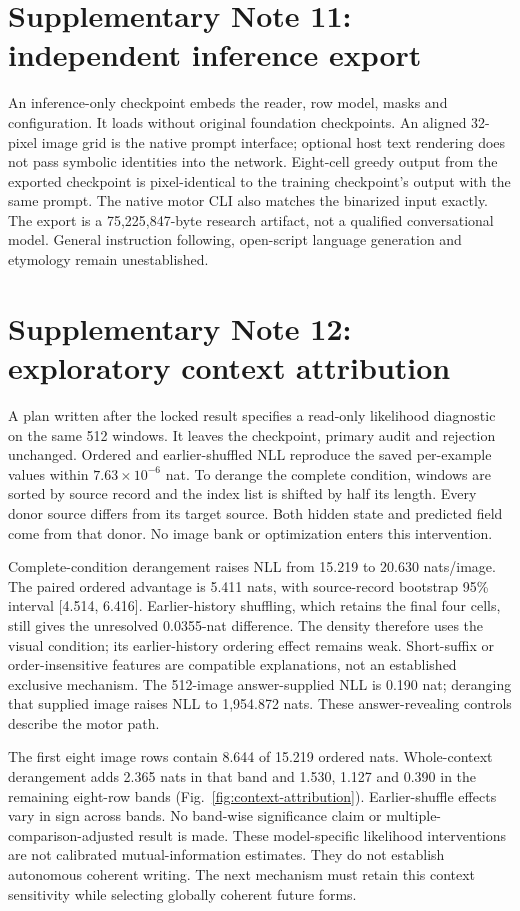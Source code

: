 \documentclass[10pt,a4paper]{article}
\begin{document}
\section*{Supplementary Note 11: independent inference export}
An inference-only checkpoint embeds the reader, row model, masks and
configuration. It loads without original foundation checkpoints. An aligned
32-pixel image grid is the native prompt interface; optional host text rendering
does not pass symbolic identities into the network. Eight-cell greedy output
from the exported checkpoint is pixel-identical to the training checkpoint's
output with the same prompt. The native motor CLI also matches the binarized
input exactly. The export is a 75,225,847-byte research artifact, not a
qualified conversational model. General instruction following, open-script
language generation and etymology remain unestablished.

\section*{Supplementary Note 12: exploratory context attribution}
A plan written after the locked result specifies a read-only likelihood
diagnostic on the same 512 windows. It leaves the checkpoint, primary audit
and rejection unchanged. Ordered and earlier-shuffled NLL reproduce the saved
per-example values within $7.63\times10^{-6}$ nat. To derange the complete
condition, windows are sorted by source record and the index list is shifted
by half its length. Every donor source differs from its target source. Both
hidden state and predicted field come from that donor. No image bank or
optimization enters this intervention.

Complete-condition derangement raises NLL from 15.219 to 20.630 nats/image.
The paired ordered advantage is 5.411 nats, with source-record bootstrap
95\% interval [4.514, 6.416]. Earlier-history shuffling, which retains the
final four cells, still gives the unresolved 0.0355-nat difference. The density
therefore uses the visual condition; its earlier-history ordering effect
remains weak. Short-suffix or order-insensitive features are compatible
explanations, not an established exclusive mechanism. The 512-image
answer-supplied NLL is 0.190 nat; deranging that supplied image raises NLL to
1,954.872 nats. These answer-revealing controls describe the motor path.

The first eight image rows contain 8.644 of 15.219 ordered nats. Whole-context
derangement adds 2.365 nats in that band and 1.530, 1.127 and 0.390 in the
remaining eight-row bands (Fig.~\ref{fig:context-attribution}). Earlier-shuffle
effects vary in sign across bands. No band-wise significance claim or
multiple-comparison-adjusted result is made. These model-specific likelihood
interventions are not calibrated mutual-information estimates. They do not
establish autonomous coherent writing. The next mechanism must retain this
context sensitivity while selecting globally coherent future forms.
\end{document}
